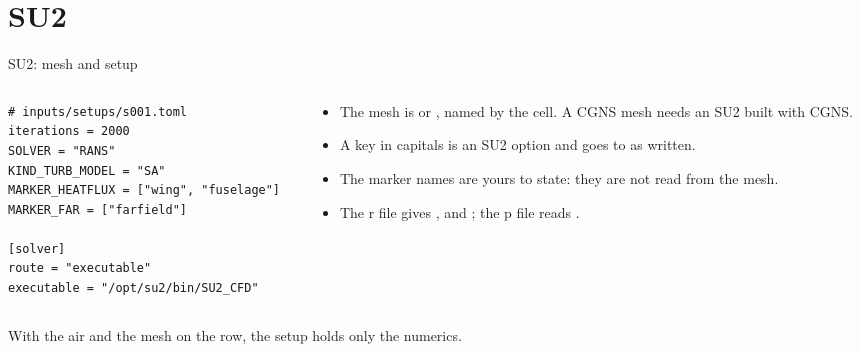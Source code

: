 %
%

\section{SU2}

\begin{frame}[fragile]{SU2: mesh and setup}
\begin{columns}[T]
\begin{column}{0.5\textwidth}
\begin{lstlisting}[style=cfdbtoml]
# inputs/setups/s001.toml
iterations = 2000
SOLVER = "RANS"
KIND_TURB_MODEL = "SA"
MARKER_HEATFLUX = ["wing", "fuselage"]
MARKER_FAR = ["farfield"]

[solver]
route = "executable"
executable = "/opt/su2/bin/SU2_CFD"
\end{lstlisting}
\end{column}
\begin{column}{0.46\textwidth}
\begin{itemize}\small
  \item The mesh is  or , named by the
         cell. A CGNS mesh needs an SU2 built with CGNS.
  \item A key in capitals is an SU2 option and goes to  as
        written.
  \item The marker names are yours to state: they are not read from the
        mesh.
  \item The r file gives ,  and
        ; the p file reads .
\end{itemize}
\end{column}
\end{columns}
\begin{takeaway}With the air and the mesh on the row, the setup holds only
the numerics.\end{takeaway}
\end{frame}

